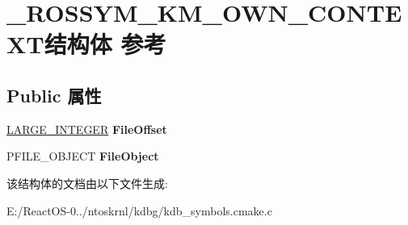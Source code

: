 \hypertarget{struct___r_o_s_s_y_m___k_m___o_w_n___c_o_n_t_e_x_t}{}\section{\+\_\+\+R\+O\+S\+S\+Y\+M\+\_\+\+K\+M\+\_\+\+O\+W\+N\+\_\+\+C\+O\+N\+T\+E\+X\+T结构体 参考}
\label{struct___r_o_s_s_y_m___k_m___o_w_n___c_o_n_t_e_x_t}
\subsection*{Public 属性}
\begin{DoxyCompactItemize}
\item 
\mbox{\label{struct___r_o_s_s_y_m___k_m___o_w_n___c_o_n_t_e_x_t_a973b9d1bfced3831ef82e00e0fab86b9}} 
\hyperlink{union___l_a_r_g_e___i_n_t_e_g_e_r}{L\+A\+R\+G\+E\+\_\+\+I\+N\+T\+E\+G\+ER} {\bfseries File\+Offset}
\item 
\mbox{\label{struct___r_o_s_s_y_m___k_m___o_w_n___c_o_n_t_e_x_t_affbdf573dac60d1849a201545274ec34}} 
P\+F\+I\+L\+E\+\_\+\+O\+B\+J\+E\+CT {\bfseries File\+Object}
\end{DoxyCompactItemize}


该结构体的文档由以下文件生成\+:\begin{DoxyCompactItemize}
\item 
E\+:/\+React\+O\+S-\/0../ntoskrnl/kdbg/kdb\+\_\+symbols.\+cmake.\+c\end{DoxyCompactItemize}

